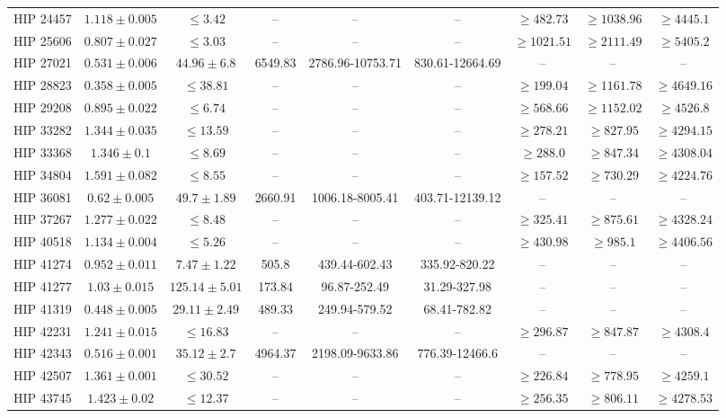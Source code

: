 {\begin{longtable}{|c|c|c|c|c|c|c|c|c|}
HIP 24457 & $ 1.118 \pm 0.005 $ & $\le 3.42 $ &-- &-- &-- & $\ge 482.73 $ & $\ge 1038.96 $ & $\ge 4445.1 $ \\
HIP 25606 & $ 0.807 \pm 0.027 $ & $\le 3.03 $ &-- &-- &-- & $\ge 1021.51 $ & $\ge 2111.49 $ & $\ge 5405.2 $ \\
HIP 27021 & $ 0.531 \pm 0.006 $ & $ 44.96 \pm 6.8 $ & 6549.83 & 2786.96-10753.71 & 830.61-12664.69 &-- &-- &-- \\
HIP 28823 & $ 0.358 \pm 0.005 $ & $\le 38.81 $ &-- &-- &-- & $\ge 199.04 $ & $\ge 1161.78 $ & $\ge 4649.16 $ \\
HIP 29208 & $ 0.895 \pm 0.022 $ & $\le 6.74 $ &-- &-- &-- & $\ge 568.66 $ & $\ge 1152.02 $ & $\ge 4526.8 $ \\
HIP 33282 & $ 1.344 \pm 0.035 $ & $\le 13.59 $ &-- &-- &-- & $\ge 278.21 $ & $\ge 827.95 $ & $\ge 4294.15 $ \\
HIP 33368 & $ 1.346 \pm 0.1 $ & $\le 8.69 $ &-- &-- &-- & $\ge 288.0 $ & $\ge 847.34 $ & $\ge 4308.04 $ \\
HIP 34804 & $ 1.591 \pm 0.082 $ & $\le 8.55 $ &-- &-- &-- & $\ge 157.52 $ & $\ge 730.29 $ & $\ge 4224.76 $ \\
HIP 36081 & $ 0.62 \pm 0.005 $ & $ 49.7 \pm 1.89 $ & 2660.91 & 1006.18-8005.41 & 403.71-12139.12 &-- &-- &-- \\
HIP 37267 & $ 1.277 \pm 0.022 $ & $\le 8.48 $ &-- &-- &-- & $\ge 325.41 $ & $\ge 875.61 $ & $\ge 4328.24 $ \\
HIP 40518 & $ 1.134 \pm 0.004 $ & $\le 5.26 $ &-- &-- &-- & $\ge 430.98 $ & $\ge 985.1 $ & $\ge 4406.56 $ \\
HIP 41274 & $ 0.952 \pm 0.011 $ & $ 7.47 \pm 1.22 $ & 505.8 & 439.44-602.43 & 335.92-820.22 &-- &-- &-- \\
HIP 41277 & $ 1.03 \pm 0.015 $ & $ 125.14 \pm 5.01 $ & 173.84 & 96.87-252.49 & 31.29-327.98 &-- &-- &-- \\
HIP 41319 & $ 0.448 \pm 0.005 $ & $ 29.11 \pm 2.49 $ & 489.33 & 249.94-579.52 & 68.41-782.82 &-- &-- &-- \\
HIP 42231 & $ 1.241 \pm 0.015 $ & $\le 16.83 $ &-- &-- &-- & $\ge 296.87 $ & $\ge 847.87 $ & $\ge 4308.4 $ \\
HIP 42343 & $ 0.516 \pm 0.001 $ & $ 35.12 \pm 2.7 $ & 4964.37 & 2198.09-9633.86 & 776.39-12466.6 &-- &-- &-- \\
HIP 42507 & $ 1.361 \pm 0.001 $ & $\le 30.52 $ &-- &-- &-- & $\ge 226.84 $ & $\ge 778.95 $ & $\ge 4259.1 $ \\
HIP 43745 & $ 1.423 \pm 0.02 $ & $\le 12.37 $ &-- &-- &-- & $\ge 256.35 $ & $\ge 806.11 $ & $\ge 4278.53 $ \\

\end{longtable}}
